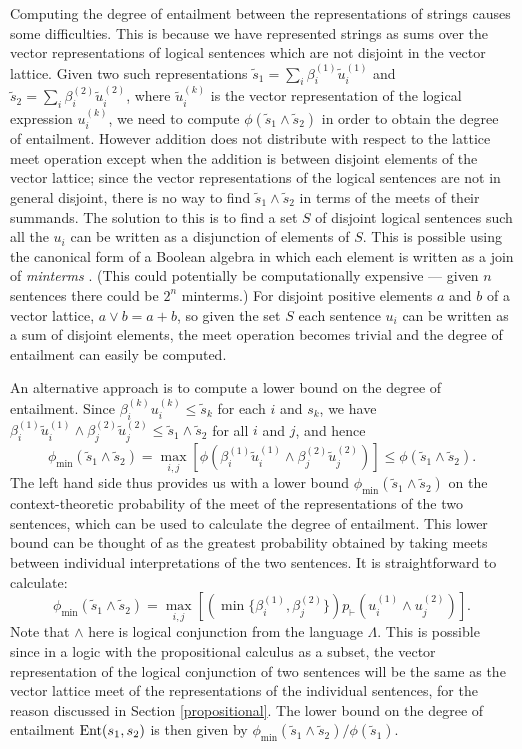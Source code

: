 Computing the degree of entailment between the representations of strings causes some difficulties. This is because we have represented strings as sums over the vector representations of logical sentences which are not disjoint in the vector lattice. Given two such representations $\tilde{s}_1 = \sum_i \beta^{(1)}_i\tilde{u}^{(1)}_i$ and $\tilde{s}_2 = \sum_i \beta^{(2)}_i\tilde{u}^{(2)}_i$, where $\tilde{u}^{(k)}_i$ is the vector representation of the logical expression $u^{(k)}_i$, we need to compute $\phi(\tilde{s}_1 \land \tilde{s}_2)$ in order to obtain the degree of entailment. However addition does not distribute with respect to the lattice meet operation except when the addition is between disjoint elements of the vector lattice; since the vector representations of the logical sentences are not in general disjoint, there is no way to find $\tilde{s}_1\land\tilde{s}_2$ in terms of the meets of their summands. The solution to this is to find a set $S$ of disjoint logical sentences such all the $u_i$ can be written as a disjunction of elements of $S$. This is possible using the canonical form of a Boolean algebra in which each element is written as a join of \emph{minterms} \citep{Birkhoff:48}. (This could potentially be computationally expensive --- given $n$ sentences there could be $2^n$ minterms.) For disjoint positive elements $a$ and $b$ of a vector lattice, $a \lor b = a + b$, so given the set $S$ each sentence $u_i$ can be written as a sum of disjoint elements, the meet operation becomes trivial and the degree of entailment can easily be computed.

An alternative approach is to compute a lower bound on the degree of entailment. Since $\beta^{(k)}_iu^{(k)}_i \le \tilde{s}_k$ for each $i$ and $s_k$, we have
$\beta^{(1)}_i\tilde{u}^{(1)}_i \land \beta^{(2)}_j\tilde{u}^{(2)}_j  \le \tilde{s}_1\land\tilde{s}_2$
for all $i$ and $j$, and hence
$$\phi_\mathrm{min}(\tilde{s}_1\land\tilde{s}_2) = \max_{i,j}\left[ \phi(\beta^{(1)}_i\tilde{u}^{(1)}_i \land \beta^{(2)}_j\tilde{u}^{(2)}_j)\right]  \le \phi(\tilde{s}_1\land\tilde{s}_2).$$
The left hand side thus provides us with a lower bound $\phi_\mathrm{min}(\tilde{s}_1\land\tilde{s}_2)$ on the context-theoretic probability of the meet of the representations of the two sentences, which can be used to calculate the degree of entailment. This lower bound can be thought of as the greatest probability obtained by taking meets between individual interpretations of the two sentences. It is straightforward to calculate:
$$\phi_\mathrm{min}(\tilde{s}_1\land\tilde{s}_2) = \max_{i,j}\left[ (\min\{\beta^{(1)}_i,\beta^{(2)}_j\})p_\vdash(u^{(1)}_i\land u^{(2)}_j) \right].$$
Note that  $\land$ here is logical conjunction from the language $\Lambda$. This is possible since in a logic with the propositional calculus as a subset, the vector representation of the logical conjunction of two sentences will be the same as the vector lattice meet of the representations of the individual sentences, for the reason discussed in Section \ref{propositional}. The lower bound on the degree of entailment $\operatorname{Ent}(s_1,s_2)$ is then given by $\phi_\mathrm{min}(\tilde{s}_1\land\tilde{s}_2)/\phi(\tilde{s}_1)$.

